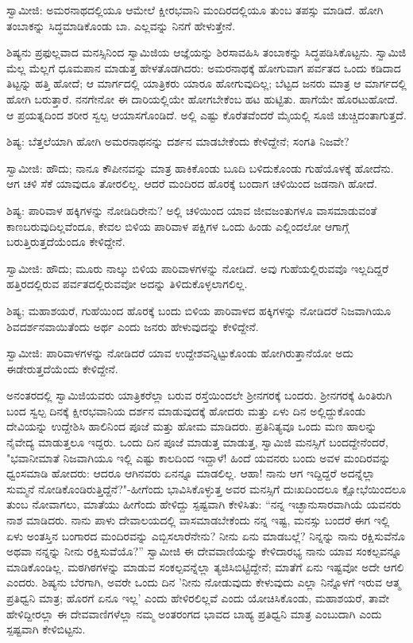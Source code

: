 ಸ್ವಾಮೀಜಿ: ಅಮರನಾಥದಲ್ಲಿಯೂ ಆಮೇಲೆ ಕ್ಷೀರಭವಾನಿ ಮಂದಿರದಲ್ಲಿಯೂ ತುಂಬ ತಪಸ್ಸು ಮಾಡಿದೆ. ಹೋಗಿ ತಂಬಾಕನ್ನು ಸಿದ್ಧಮಾಡಿಕೊಂಡು ಬಾ. ಎಲ್ಲವನ್ನು ನಿನಗೆ ಹೇಳುತ್ತೇನೆ.

ಶಿಷ್ಯನು ಪ್ರಫುಲ್ಲವಾದ ಮನಸ್ಸಿನಿಂದ ಸ್ವಾಮಿಜಿಯ ಆಜ್ಞೆಯನ್ನು ಶಿರಸಾವಹಿಸಿ ತಂಬಾಕನ್ನು ಸಿದ್ಧಪಡಿಸಿಕೊಟ್ಟನು. ಸ್ವಾಮಿಜಿ ಮೆಲ್ಲ ಮೆಲ್ಲಗೆ ಧೂಮಪಾನ ಮಾಡುತ್ತ ಹೇಳತೊಡಗಿದರು: ಅಮರನಾಥಕ್ಕೆ ಹೋಗುವಾಗ ಪರ್ವತದ ಒಂದು ಕಡಿದಾದ ತಿಟ್ಟನ್ನು ಹತ್ತಿ ಹೋದೆ; ಆ ಮಾರ್ಗದಲ್ಲಿ ಯಾತ್ರಿಕರು ಯಾರೂ ಹೋಗುವುದಿಲ್ಲ; ಬೆಟ್ಟದ ಜನರು ಮಾತ್ರ ಆ ಮಾರ್ಗದಲ್ಲಿ ಹೋಗಿ ಬರುತ್ತಾರೆ. ನನಗೇನೋ ಈ ದಾರಿಯಲ್ಲಿಯೇ ಹೋಗಬೇಕೆಂಬ ಹಟ ಹುಟ್ಟಿತು. ಹಾಗೆಯೇ ಹೊರಟುಹೋದೆ. ಆ ಪ್ರಯತ್ನದಿಂದ ಶರೀರ ಸ್ವಲ್ಪ ಆಯಾಸಗೊಂಡಿದೆ. ಅಲ್ಲಿ ಎಷ್ಟು ಕೊರೆತವೆಂದರೆ ಮೈಯಲ್ಲಿ ಸೂಜಿ ಚುಚ್ಚಿದಂತಾಗುತ್ತದೆ.

ಶಿಷ್ಯ: ಬೆತ್ತಲೆಯಾಗಿ ಹೋಗಿ ಅಮರನಾಥನನ್ನು ದರ್ಶನ ಮಾಡಬೇಕೆಂದು ಕೇಳಿದ್ದೇನೆ; ಸಂಗತಿ ನಿಜವೇ?

ಸ್ವಾಮೀಜಿ: ಹೌದು; ನಾನೂ ಕೌಪೀನವನ್ನು ಮಾತ್ರ ಹಾಕಿಕೊಂಡು ಬೂದಿ ಬಳಿದುಕೊಂಡು ಗುಹೆಯೊಳಕ್ಕೆ ಹೋದೆನು. ಆಗ ಚಳಿ ಸೆಕೆ ಯಾವುದೂ ತೋರಲಿಲ್ಲ. ಆದರೆ ಮಂದಿರದ ಹೊರಕ್ಕೆ ಬಂದಾಗ ಚಳಿಯಿಂದ ಜಡನಾಗಿ ಹೋದೆ.

ಶಿಷ್ಯ: ಪಾರಿವಾಳ ಹಕ್ಕಿಗಳನ್ನು ನೋಡಿದಿರೇನು? ಅಲ್ಲಿ ಚಳಿಯಿಂದ ಯಾವ ಜೀವಜಂತುಗಳೂ ವಾಸಮಾಡುವಂತೆ ಕಾಣಬರುವುದಿಲ್ಲವೆಂದೂ, ಕೇವಲ ಬಿಳಿಯ ಪಾರಿವಾಳ ಪಕ್ಷಿಗಳ ಒಂದು ಹಿಂಡು ಎಲ್ಲಿಂದಲೋ ಆಗಾಗ್ಗೆ ಬರುತ್ತಿರುತ್ತದೆಯೆಂದೂ ಕೇಳಿದ್ದೇನೆ.

ಸ್ವಾಮೀಜಿ: ಹೌದು; ಮೂರು ನಾಲ್ಕು ಬಿಳಿಯ ಪಾರಿವಾಳಗಳನ್ನು ನೋಡಿದೆ. ಅವು ಗುಹೆಯಲ್ಲಿರುವವೊ ಇಲ್ಲದಿದ್ದರೆ ಹತ್ತಿರದಲ್ಲಿರುವ ಪರ್ವತದಲ್ಲಿರುವವೋ ಅದನ್ನು ತಿಳಿದುಕೊಳ್ಳಲಾಗಲಿಲ್ಲ.

ಶಿಷ್ಯ; ಮಹಾಶಯರೆ, ಗುಹೆಯಿಂದ ಹೊರಕ್ಕೆ ಬಂದು ಬಿಳಿಯ ಪಾರಿವಾಳದ ಹಕ್ಕಿಗಳನ್ನು ನೋಡಿದರೆ ನಿಜವಾಗಿಯೂ ಶಿವದರ್ಶನವಾಯಿತೆಂದು ಅರ್ಥ ಎಂದು ಜನರು ಹೇಳುವುದನ್ನು ಕೇಳಿದ್ದೇನೆ.

ಸ್ವಾಮೀಜಿ: ಪಾರಿವಾಳಗಳನ್ನು ನೋಡಿದರೆ ಯಾವ ಉದ್ದೇಶವನ್ನಿಟ್ಟುಕೊಂಡು ಹೋಗಿರುತ್ತಾನೆಯೋ ಅದು ಈಡೇರುತ್ತದೆಯೆಂದು ಕೇಳಿದ್ದೇನೆ.

ಅನಂತರದಲ್ಲಿ ಸ್ವಾಮಿಜಿಯವರು ಯಾತ್ರಿಕರೆಲ್ಲಾ ಬರುವ ರಸ್ತೆಯಿಂದಲೇ ಶ‍್ರೀನಗರಕ್ಕೆ ಬಂದರು. ಶ‍್ರೀನಗರಕ್ಕೆ ಹಿಂತಿರುಗಿ ಬಂದ ಸ್ವಲ್ಪ ದಿನಕ್ಕೆ ಕ್ಷೀರಭವಾನಿಯ ದರ್ಶನ ಮಾಡುವುದಕ್ಕೆ ಹೋದರು ಮತ್ತು ಏಳು ದಿನ ಅಲ್ಲಿದ್ದುಕೊಂಡು ದೇವಿಯನ್ನು ಉದ್ದೇಶಿಸಿ ಹಾಲಿನಿಂದ ಪೂಜೆ ಮತ್ತು ಹೋಮ ಮಾಡಿದರು. ಪ್ರತಿನಿತ್ಯವೂ ಒಂದು ಮಣ ಹಾಲನ್ನು ನೈವೇದ್ಯ ಮಾಡುತ್ತಲೂ ಇದ್ದರು. ಒಂದು ದಿನ ಪೂಜೆ ಮಾಡುತ್ತ ಮಾಡುತ್ತ, ಸ್ವಾಮಿಜಿ ಮನಸ್ಸಿಗೆ ಬಂದದ್ದೇನೆಂದರೆ, "ಭವಾನೀಮಾತೆ ನಿಜವಾಗಿಯೂ ಇಲ್ಲಿ ಎಷ್ಟು ಕಾಲದಿಂದ ಇದ್ದಾಳೆ! ಹಿಂದೆ ಯವನರು ಬಂದು ಅವಳ ಮಂದಿರವನ್ನು ಧ್ವಂಸಮಾಡಿ ಹೋದರು: ಆದರೂ ಆಗಿನವರು ಏನನ್ನೂ ಮಾಡಲಿಲ್ಲ. ಆಹಾ! ನಾನು ಆಗ ಇದ್ದಿದ್ದರೆ ಅದನ್ನೆಲ್ಲಾ ಸುಮ್ಮನೆ ನೋಡಿಕೊಂಡಿರುತ್ತಿದ್ದೆನೆ?"-ಹೀಗೆಂದು ಭಾವಿಸಿಕೊಳ್ಳುತ್ತ ಅವರ ಮನಸ್ಸಿಗೆ ದುಃಖದಿಂದಲೂ ಕ್ಷೋಭೆಯಿಂದಲೂ ತುಂಬ ನೋವಾಗಲು, ಮಾತೆಯು ಹೀಗೆಂದು ಹೇಳಿದ್ದು ಸ್ಪಷ್ಟವಾಗಿ ಕೇಳಿಸಿತು: “ನನ್ನ ಇಚ್ಛಾನುಸಾರವಾಗಿಯೆ ಯವನರು ನಾಶ ಮಾಡಿದರು. ನಾನು ಪಾಳು ದೇವಾಲಯದಲ್ಲಿ ವಾಸಮಾಡಬೇಕೆಂದು ನನ್ನ ಇಷ್ಟ, ಮನಸ್ಸು ಬಂದರೆ ಈಗ ಇಲ್ಲಿ ಏಳು ಅಂತಸ್ತಿನ ಬಂಗಾರದ ಮಂದಿರವನ್ನು ಎಬ್ಬಿಸಲಾರೆನೇನು? ನೀನು ಏನು ಮಾಡಬಲ್ಲೆ? ನಿನ್ನನ್ನು ನಾನು ರಕ್ಷಿಸುವೆನೊ ಅಥವಾ ನನ್ನನ್ನು ನೀನು ರಕ್ಷಿಸುವೆಯೊ?” ಸ್ವಾಮೀಜಿ ಈ ದೇವವಾಣಿಯನ್ನು ಕೇಳಿದಾರಭ್ಯ ನಾನು ಯಾವ ಸಂಕಲ್ಪವನ್ನೂ ಮಾಡಿಕೊಂಡಿಲ್ಲ. ಮಠಗಿಠಗಳನ್ನು ಮಾಡುವ ಸಂಕಲ್ಪವನ್ನೆಲ್ಲಾ ತ್ಯಜಿಸಿಬಿಟ್ಟಿದ್ದೇನೆ; ಮಾತೆಗೆ ಏನು ಇಷ್ಟವೋ ಅದೇ ಆಗಲಿ ಎಂದರು. ಶಿಷ್ಯನು ಬೆರಗಾಗಿ, ಅವರೇ ಒಂದು ದಿನ 'ನೀನು ನೋಡುವುದು ಕೇಳುವುದು ಎಲ್ಲಾ ನಿನ್ನೊಳಗೆ ಇರುವ ಆತ್ಮ ಪ್ರತಿಧ್ವನಿ ಮಾತ್ರ; ಹೊರಗೆ ಏನೂ ಇಲ್ಲ' ಎಂದು ಹೇಳಿರಲಿಲ್ಲವೆ ಎಂದು ಯೋಚಿಸಿಕೊಂಡು, ಮಹಾಶಯರೆ, ತಾವೇ ಹೇಳಿದ್ದೀರಲ್ಲಾ ಈ ದೇವವಾಣಿಗಳೆಲ್ಲಾ ನಮ್ಮ ಅಂತರಂಗದ ಭಾವದ ಬಾಹ್ಯ ಪ್ರತಿಧ್ವನಿ ಮಾತ್ರ ಎಂಬುದಾಗಿ ಎಂದು ಸ್ಪಷ್ಟವಾಗಿ ಕೇಳಿಬಿಟ್ಟನು.

